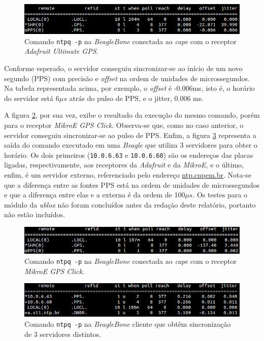 \begin{figure}[h]
    
    \centering
    \includegraphics[scale=0.6]{image/adafruit_GPS}
    \caption {Comando \texttt{ntpq -p} na
    \textit{BeagleBone} conectada ao \textit{cape} com o receptor
    \textit{Adafruit Ultimate GPS}.}
    \label{img:adafruit} 
\end{figure} 

\vspace{12pt}

Conforme esperado, o servidor conseguiu sincronizar-se ao início de um novo
segundo (PPS) com precisão e \textit{offset} na ordem de unidades de
microssegundos. Na tabela representada acima, por exemplo, o \textit{offset} é
-0.006ms, isto é, o horário do servidor está 6\(\mu s\) atrás do pulso de
PPS, e o jitter, 0.006 ms.

\vspace{12pt}

A figura \ref{img:mikroe}, por sua vez, exibe o resultado da execução do mesmo
comando, porém para o receptor \textit{MikroE GPS Click}. Observa-se que,
como no caso anterior, o servidor conseguiu sincronizar-se ao pulso de PPS.
Enfim, a figura \ref{img:cliente_ntp} representa a saída do comando executado em
uma \textit{Beagle} que utiliza 3 servidores para obter o horário. Os dois
primeiros (\texttt{10.0.6.63} e \texttt{10.0.6.60}) são os endereços das placas
ligadas, respectivamente, aos receptores da \textit{Adafruit} e da
\textit{MikroE}, e o último, enfim, é um servidor externo, referenciado pelo
endereço \url{ntp.cnpem.br}.  Nota-se que a diferença entre as fontes PPS está
na ordem de unidades de microssegundos e que a diferença entre elas e a externa
é da ordem de 100\(\mu s\). Os testes para o módulo da \textit{ublox} não foram
concluídos antes da redação deste relatório, portanto não estão incluídos.

\begin{figure}[h]
    \centering
    \includegraphics[scale=0.6]{image/mikroe}
    \caption {Comando \texttt{ntpq -p} na
    \textit{BeagleBone} conectada ao \textit{cape} com o receptor \textit{MikroE
    GPS Click}.}  
    \label{img:mikroe} 
\end{figure} 

\begin{figure}[h!]
    
    \centering
    \includegraphics[scale=0.6]{image/cliente-ntp}
    \caption {Comando \texttt{ntpq -p} na \textit{BeagleBone} cliente que obtêm sincronização de 3 servidores distintos.}
    \label{img:cliente_ntp} 
\end{figure} 